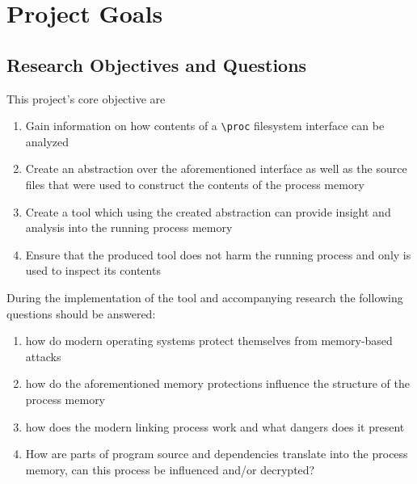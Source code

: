 \section{Project Goals}
\label{sec:goals}

\subsection{Research Objectives and Questions}

This project's core objective are
\begin{enumerate}
    \item Gain information on how contents of a \verb|\proc| filesystem interface can be analyzed
    
    \item Create an abstraction over the aforementioned interface as well as the source files that were used to construct the contents of the process memory

    \item Create a tool which using the created abstraction can provide insight and analysis into the running process memory
    
    \item Ensure that the produced tool does not harm the running process and only is used to inspect its contents

\end{enumerate}

During the implementation of the tool and accompanying research the following questions should be answered:

\begin{enumerate}
    \item  how do modern operating systems protect themselves from memory-based attacks
    
    \item  how do the aforementioned memory protections influence the structure of the process memory
    
    \item  how does the modern linking process work and what dangers does it present
    
    \item  How are parts of program source and dependencies translate into the process memory, can this process be influenced and/or decrypted?
\end{enumerate}


